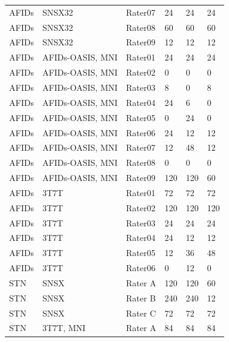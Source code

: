 \begin{table}[htbp]
\begin{tabular}{llllll}
AFIDs & SNSX32 & Rater07 & 24 & 24 & 24 \\
AFIDs & SNSX32 & Rater08 & 60 & 60 & 60 \\
AFIDs & SNSX32 & Rater09 & 12 & 12 & 12 \\
AFIDs & AFIDs-OASIS, MNI & Rater01 & 24 & 24 & 24 \\
AFIDs & AFIDs-OASIS, MNI & Rater02 & 0 & 0 & 0 \\
AFIDs & AFIDs-OASIS, MNI & Rater03 & 8 & 0 & 8 \\
AFIDs & AFIDs-OASIS, MNI & Rater04 & 24 & 6 & 0 \\
AFIDs & AFIDs-OASIS, MNI & Rater05 & 0 & 24 & 0 \\
AFIDs & AFIDs-OASIS, MNI & Rater06 & 24 & 12 & 12 \\
AFIDs & AFIDs-OASIS, MNI & Rater07 & 12 & 48 & 12 \\
AFIDs & AFIDs-OASIS, MNI & Rater08 & 0 & 0 & 0 \\
AFIDs & AFIDs-OASIS, MNI & Rater09 & 120 & 120 & 60 \\
AFIDs & 3T7T & Rater01 & 72 & 72 & 72 \\
AFIDs & 3T7T & Rater02 & 120 & 120 & 120 \\
AFIDs & 3T7T & Rater03 & 24 & 24 & 24 \\
AFIDs & 3T7T & Rater04 & 24 & 12 & 12 \\
AFIDs & 3T7T & Rater05 & 12 & 36 & 48 \\
AFIDs & 3T7T & Rater06 & 0 & 12 & 0 \\
STN & SNSX & Rater A & 120 & 120 & 60 \\
STN & SNSX & Rater B & 240 & 240 & 12 \\
STN & SNSX & Rater C & 72 & 72 & 72 \\
STN & 3T7T, MNI & Rater A & 84 & 84 & 84 \\
\bottomrule
\end{tabular}
\label{tab:rater_demographic_data}
\end{table}